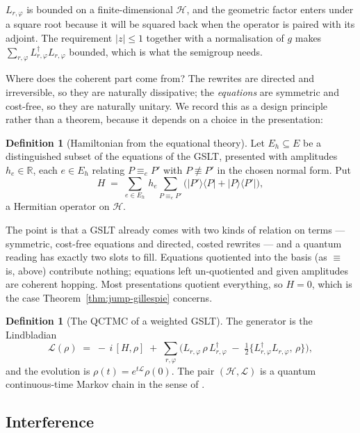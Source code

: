 \documentclass[11pt,a4paper]{article}
\theoremstyle{plain}
\theoremstyle{definition}
\newtheorem{definition}[theorem]{Definition}
\theoremstyle{remark}
\newcommand{\gfac}{g}
\newcommand{\Lop}{L}
\begin{document}
$\Lop_{r,\varphi}$ is bounded on a finite-dimensional $\mathcal{H}$, and the geometric factor enters
under a square root because it will be squared back when the operator is paired with its adjoint.
The requirement $|z| \le 1$ together with a normalisation of $\gfac$ makes
$\sum_{r,\varphi}\Lop^\dagger_{r,\varphi}\Lop_{r,\varphi}$ bounded, which is what the semigroup needs.

Where does the coherent part come from? The rewrites are directed and irreversible, so they are
naturally dissipative; the \emph{equations} are symmetric and cost-free, so they are naturally
unitary. We record this as a design principle rather than a theorem, because it depends on a choice
in the presentation:

\begin{definition}[Hamiltonian from the equational theory]
\label{def:hamiltonian}
Let $E_h \subseteq E$ be a distinguished subset of the equations of the GSLT, presented with
amplitudes $h_e \in \mathbb{R}$, each $e \in E_h$ relating $P \equiv_e P'$ with $P \not\equiv P'$
in the chosen normal form. Put
\[
H \;=\; \sum_{e \in E_h}\, h_e \sum_{P \equiv_e P'} \big(|P'\rangle\langle P| + |P\rangle\langle P'|\big),
\]
a Hermitian operator on $\mathcal{H}$.
\end{definition}

The point is that a GSLT already comes with two kinds of relation on terms --- symmetric, cost-free
equations and directed, costed rewrites --- and a quantum reading has exactly two slots to fill.
Equations quotiented into the basis (as $\equiv$ is, above) contribute nothing; equations left
un-quotiented and given amplitudes are coherent hopping. Most presentations quotient everything, so
$H = 0$, which is the case Theorem~\ref{thm:jump-gillespie} concerns.

\begin{definition}[The QCTMC of a weighted GSLT]
\label{def:qctmc}
The generator is the Lindbladian
\[
\mathcal{L}(\rho) \;=\; -\,i\,[H, \rho] \;+\; \sum_{r,\varphi}\Big( \Lop_{r,\varphi}\,\rho\,\Lop^\dagger_{r,\varphi} \;-\; \tfrac{1}{2}\big\{\Lop^\dagger_{r,\varphi}\Lop_{r,\varphi},\, \rho\big\}\Big),
\]
and the evolution is $\rho(t) = e^{t\mathcal{L}}\rho(0)$. The pair $(\mathcal{H}, \mathcal{L})$ is a
quantum continuous-time Markov chain in the sense of \cite{qctmc}.
\end{definition}

\subsection{Interference}
\label{sec:interference}
\end{document}
